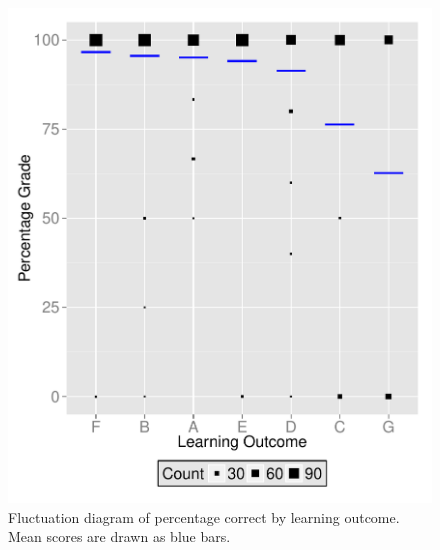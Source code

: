 \documentclass[12pt,english,nohyper]{tufte-handout}\usepackage[]{graphicx}\usepackage[]{color}
\begin{document}
\begin{figure}[!ht]
\includegraphics[width=\linewidth]{Topic01_JKQ_LearningObj_boxplot.pdf}
\caption{Fluctuation diagram of percentage correct by learning outcome. Mean scores are drawn as blue bars.}
\label{fig:LearningObj_summary}
\end{figure}
\end{document}
